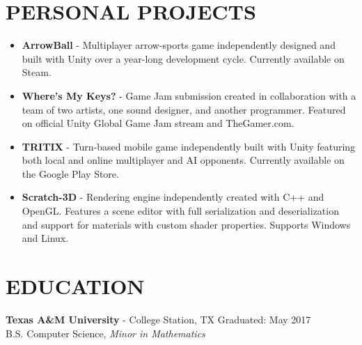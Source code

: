 \documentclass[resmargin,10pt]{res} %
\begin{document}
\begin{resume}
\section{PERSONAL PROJECTS}
				\begin{itemize}       
				\item \textbf{ArrowBall} - Multiplayer arrow-sports game independently designed and built with Unity over a year-long development cycle. Currently available on Steam.
                	\item \textbf{Where's My Keys?} - Game Jam submission created in collaboration with a team of two artists, one sound designer, and another programmer. Featured on official Unity Global Game Jam stream and TheGamer.com.
                	\item \textbf{TRITIX} - Turn-based mobile game independently built with Unity featuring both local and online multiplayer and AI opponents. Currently available on the Google Play Store.
                	\item \textbf{Scratch-3D} - Rendering engine independently created with C++ and OpenGL. Features a scene editor with full serialization and deserialization and support for materials with custom shader properties. Supports Windows and Linux.
                \end{itemize}
                
\section{EDUCATION}
{\bf Texas A\&M University} - College Station, TX \hfill
Graduated: May 2017 \\
B.S. Computer Science,
\textit{Minor in Mathematics}
\end{resume} 
\end{document}
